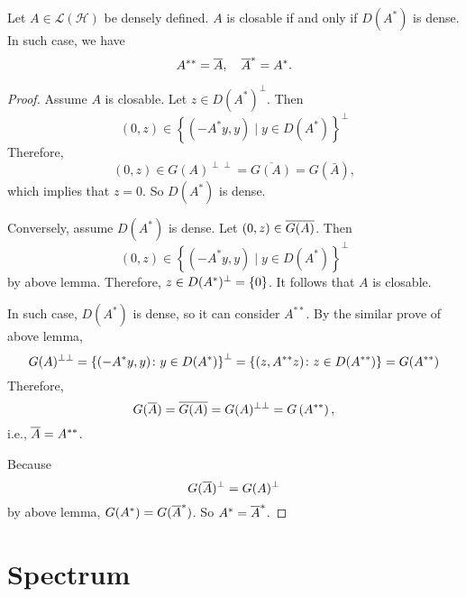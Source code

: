 \documentclass[a4paper,12pt]{article}
\begin{document}
\begin{thm}
    Let $A \in \mathcal{L}(\mathcal{H})$ be densely defined. $A$ is closable if and only if $D(A^*)$ is dense. In such case, we have
    \begin{equation*}
        A^{**} = \overline{A},\quad \overline{A}^* = A^*.
    \end{equation*}
\end{thm}
\begin{proof}
    Assume $A$ is closable. Let $z \in D(A^*)^\perp$. Then 
    \begin{equation*}
        (0, z) \in\left\{\left(-A^* y, y\right) \mid y \in D\left(A^*\right)\right\}^{\perp}
    \end{equation*}
    Therefore,
    \begin{equation*}
        (0, z) \in G(A)^{\perp \perp}=\overline{G(A)}=G(\bar{A}),
    \end{equation*}
    which implies that $z = 0$. So $D(A^*)$ is dense.

    Conversely, assume $D(A^*)$ is dense. Let $(0,z) \in \overline{G(A)}$. Then
    \begin{equation*}
        (0,z) \in \left\{\left(-A^* y, y\right) \mid y \in D\left(A^*\right)\right\}^{\perp}
    \end{equation*}
    by above lemma. Therefore, $z \in D(A^*)^\perp = \left\{0\right\}$. It follows that $A$ is closable.

    In such case, $D(A^*)$ is dense, so it can consider $A^{**}$. By the similar prove of above lemma,
    \begin{equation*}
        G(A)^{\perp\perp} = \left\{(-A^*y,y) \colon y \in D(A^*)\right\}^\perp = \left\{(z,A^{**}z) \colon z \in D(A^{**})\right\} = G(A^{**})
    \end{equation*}
    Therefore,
    \begin{equation*}
        G(\overline{A})=\overline{G(A)}=G(A)^{\perp \perp}=G\left(A^{* *}\right),
    \end{equation*}
    i.e., $\overline{A} = A^{**}$.

    Because
    \begin{equation*}
        G(\overline{A})^\perp = G(A)^\perp
    \end{equation*}
    by above lemma, $G(A^*) = G(\overline{A}^*)$. So $A^* = \overline{A}^{*}$. \qedhere
\end{proof}

\section{Spectrum}
\end{document}
